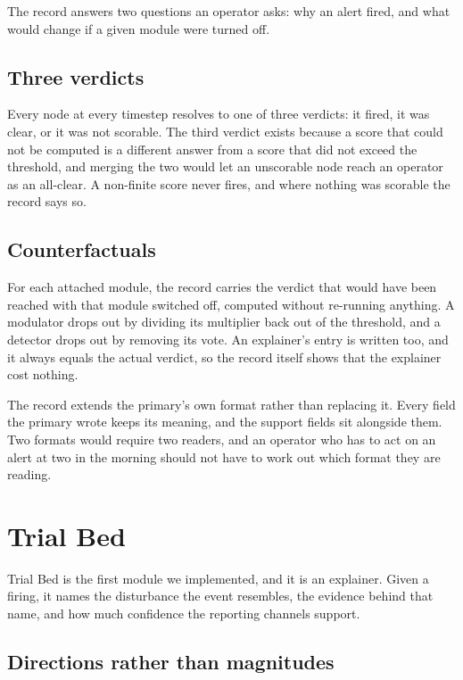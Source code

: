 \documentclass{article}
\begin{document}
The record answers two questions an operator asks: why an alert fired, and
what would change if a given module were turned off.

\subsection{Three verdicts}

Every node at every timestep resolves to one of three verdicts: it fired, it
was clear, or it was not scorable. The third verdict exists because a score
that could not be computed is a different answer from a score that did not
exceed the threshold, and merging the two would let an unscorable node reach an
operator as an all-clear. A non-finite score never fires, and where nothing
was scorable the record says so.

\subsection{Counterfactuals}

For each attached module, the record carries the verdict that would have been
reached with that module switched off, computed without re-running anything. A
modulator drops out by dividing its multiplier back out of the threshold, and a
detector drops out by removing its vote. An explainer's entry is written too,
and it always equals the actual verdict, so the record itself shows that the
explainer cost nothing.

The record extends the primary's own format rather than replacing it. Every
field the primary wrote keeps its meaning, and the support fields sit
alongside them. Two formats would require two readers, and an operator who has
to act on an alert at two in the morning should not have to work out which
format they are reading.

\section{Trial Bed}
\label{sec:trialbed}

Trial Bed is the first module we implemented, and it is an explainer. Given a
firing, it names the disturbance the event resembles, the evidence behind that
name, and how much confidence the reporting channels support.

\subsection{Directions rather than magnitudes}
\end{document}
